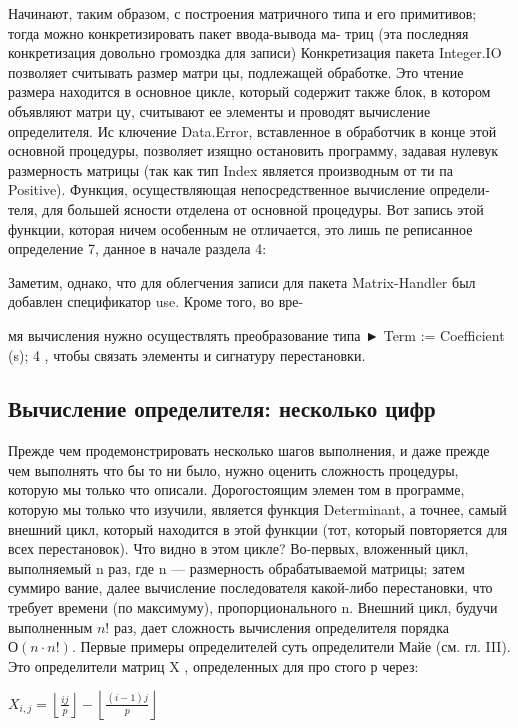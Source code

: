 \documentclass{../../template/mai_book}
\begin{document}
Начинают, таким образом, с построения матричного типа и его
примитивов; тогда можно конкретизировать пакет ввода-вывода ма-
\newpage
триц (эта последняя конкретизация довольно громоздка для записи)
Конкретизация пакета Integer.IO позволяет считывать размер матри­
цы, подлежащей обработке. Это чтение размера находится в основное
цикле, который содержит также блок, в котором объявляют матри­
цу, считывают ее элементы и проводят вычисление определителя. Ис­
ключение Data.Error, вставленное в обработчик в конце этой основной
процедуры, позволяет изящно остановить программу, задавая нулевук
размерность матрицы (так как тип Index является производным от ти­
па Positive).
Функция, осуществляющая непосредственное вычисление определи­
теля, для большей ясности отделена от основной процедуры. Вот запись
этой функции, которая ничем особенным не отличается, это лишь пе­
реписанное определение 7, данное в начале раздела 4:


Заметим, однако, что для облегчения записи для пакета
Matrix-Handler был добавлен спецификатор use. Кроме того, во вре-
\newpage

мя вычисления нужно осуществлять преобразование типа ► Term :=
Coefficient (s); 4 , чтобы связать элементы и сигнатуру перестановки.

\subsection{Вычисление определителя: несколько цифр}

Прежде чем продемонстрировать несколько шагов выполнения, и даже
прежде чем выполнять что бы то ни было, нужно оценить сложность
процедуры, которую мы только что описали. Дорогостоящим элемен­
том в программе, которую мы только что изучили, является функция
Determinant, а точнее, самый внешний цикл, который находится в этой
функции (тот, который повторяется для всех перестановок).
Что видно в этом цикле? Во-первых, вложенный цикл, выполняемый
n раз, где n — размерность обрабатываемой матрицы; затем суммиро­
вание, далее вычисление последователя какой-либо перестановки, что
требует времени (по максимуму), пропорционального n. Внешний цикл,
будучи выполненным $n!$ раз, дает сложность вычисления определителя
порядка $О(n \cdot n!)$. Первые примеры определителей суть определители
Майе (см. гл. III). Это определители матриц X , определенных для про­
стого р через:

\begin{center}
\( X_{i,j} = \left\lfloor \frac{ij}{p} \right\rfloor - \left\lfloor \frac{(i-1)j}{p} \right\rfloor \)
\end{center}
\end{document}
